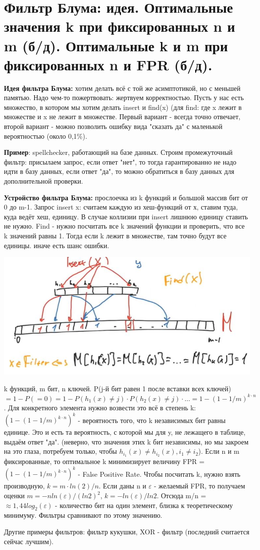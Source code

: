 \section{Фильтр Блума: идея. Оптимальные значения k при фиксированных n и m (б/д). Оптимальные k и m при фиксированных n и FPR (б/д).}
\textbf{Идея фильтра Блума:} хотим делать всё с той же асимптотикой, но с меньшей памятью. Надо чем-то пожертвовать: жертвуем корректностью. Пусть у нас есть множество, в котором мы хотим делать insert и find(x) (для find: где x лежит в множестве и x не лежит в множестве. Первый вариант - всегда точно отвечает, второй вариант - можно позволить ошибку вида "сказать да" с маленькой вероятностью (около 0,1\%). \par
\textbf{Пример}: spellchecker, работающий на базе данных. Строим промежуточный фильтр: присылаем запрос, если ответ "нет", то тогда гарантированно не надо идти в базу данных, если ответ "да", то можно обратиться в базу данных для дополнительной проверки. \par
\textbf{Устройство фильтра Блума:} прослоечка из k функций и большой массив бит от 0 до m-1. Запрос insert x: считаем каждую из хеш-функций от х, ставим туда, куда ведёт хеш, единицу. В случае коллизии при insert лишнюю единицу ставить не нужно. Find - нужно посчитать все k значений функции и проверить, что все k значений равны 1. Тогда если k лежит в множестве, там точно будут все единицы. иначе есть шанс ошибки. \par
\includegraphics{images/76-83_bloom filter.JPG} \par
k функций, m бит, n ключей. P(j-й бит равен 1 после вставки всех ключей) $= 1 - P(=0) = 1 - P(h_1(x) \neq j) \cdot P(h_2(x) \neq j) \cdot \dots = 1 - (1 - 1/m)^{k \cdot n}$. Для конкретного элемента нужно возвести это всё в степень k: $(1 - (1 - 1/m)^{k \cdot n})^k$ - вероятность того, что k независимых бит равны единице. Это и есть та вероятность, с которой мы для y, не лежащего в таблице, выдаём ответ "да". (неверно, что значения этих k бит независимы, но мы закроем на это глаза, потребуем только, чтобы $h_{i_1}(x) \neq h_{i_2}(x), i_1 \neq i_2$). Если n и m фиксированные, то оптимальное k минимизирует величину FPR = $(1 - (1 - 1/m)^{k \cdot n})^k$ - False Positive Rate. Чтобы посчитать k, нужно взять производную, $k = m \cdot ln(2)/n$. Если даны n и $\varepsilon$ - желаемый FPR, то получаем оценки $m = -n ln(\varepsilon)/(ln 2)^2$, $k = - ln(\varepsilon)/ln 2$. Отсюда m/n = $\approx 1,44 log_2(\varepsilon)$ - количество бит на один элемент, близка к теоретическому минимуму. Фильтры сравнивают по этому значению. \par
Другие примеры фильтров: фильтр кукушки, XOR - фильтр (последний считается сейчас лучшим).